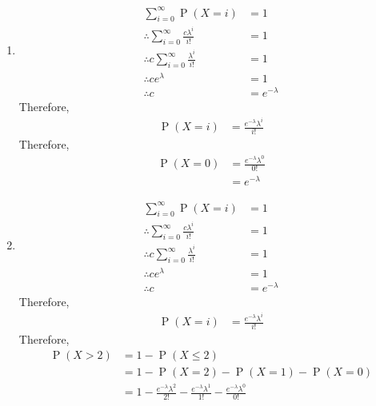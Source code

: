 \documentclass[titlepage, fleqn, a4paper, 12pt, twoside]{article}
\theoremstyle{definition}
\theoremstyle{theorem}
\DeclareMathOperator{\prob}{\mathrm{P}}
\begin{document}
\begin{solution}
	\begin{enumerate}[leftmargin=*]
		\item
			\begin{align*}
				\sum\limits_{i = 0}^{\infty} \prob(X = i)                      & = 1 \\
				\therefore \sum\limits_{i = 0}^{\infty} \frac{c \lambda^i}{i!} & = 1 \\
				\therefore c \sum\limits_{i = 0}^{\infty} \frac{\lambda^i}{i!} & = 1 \\
				\therefore c e^{\lambda}                                       & = 1 \\
				\therefore c                                                   & = e^{-\lambda}
			\end{align*}
			Therefore,
			\begin{align*}
				\prob(X = i) & = \frac{e^{-\lambda} \lambda^i}{i!}
			\end{align*}
			Therefore,
			\begin{align*}
				\prob(X = 0) & = \frac{e^{-\lambda} \lambda^0}{0!} \\
                                             & = e^{-\lambda}
			\end{align*}
		\item
			\begin{align*}
				\sum\limits_{i = 0}^{\infty} \prob(X = i)                      & = 1 \\
				\therefore \sum\limits_{i = 0}^{\infty} \frac{c \lambda^i}{i!} & = 1 \\
				\therefore c \sum\limits_{i = 0}^{\infty} \frac{\lambda^i}{i!} & = 1 \\
				\therefore c e^{\lambda}                                       & = 1 \\
				\therefore c                                                   & = e^{-\lambda}
			\end{align*}
			Therefore,
			\begin{align*}
				\prob(X = i) & = \frac{e^{-\lambda} \lambda^i}{i!}
			\end{align*}
			Therefore,
			\begin{align*}
				\prob(X > 2) & = 1 - \prob(X \le 2)                             \\
                                             & = 1 - \prob(X = 2) - \prob(X = 1) - \prob(X = 0) \\
                                             & = 1 - \frac{e^{-\lambda} \lambda^2}{2!} - \frac{e^{-\lambda} \lambda^1}{1!} - \frac{e^{-\lambda} \lambda^0}{0!}
			\end{align*}
	\end{enumerate}
\end{solution}
\end{document}
